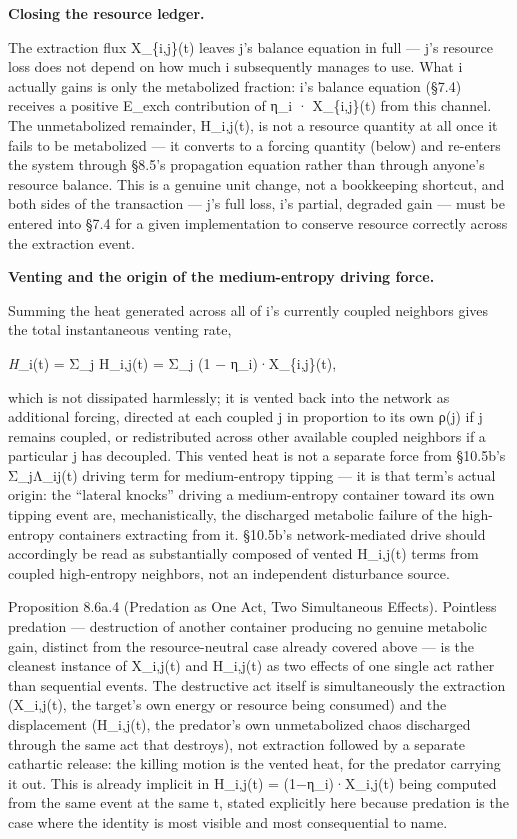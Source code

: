 \documentclass[
]{article}
\begin{document}
\textbf{Closing the resource ledger.}

The extraction flux X\_\{i,j\}(t) leaves j's balance equation in full
--- j's resource loss does not depend on how much i subsequently manages
to use. What i actually gains is only the metabolized fraction: i's
balance equation (§7.4) receives a positive E\_exch contribution of η\_i
· X\_\{i,j\}(t) from this channel. The unmetabolized remainder,
H\_i,j(t), is not a resource quantity at all once it fails to be
metabolized --- it converts to a forcing quantity (below) and re-enters
the system through §8.5's propagation equation rather than through
anyone's resource balance. This is a genuine unit change, not a
bookkeeping shortcut, and both sides of the transaction --- j's full
loss, i's partial, degraded gain --- must be entered into §7.4 for a
given implementation to conserve resource correctly across the
extraction event.

\textbf{Venting and the origin of the medium-entropy driving force.}

Summing the heat generated across all of i's currently coupled neighbors
gives the total instantaneous venting rate,

\emph{H}\_i(t) = Σ\_j H\_i,j(t) = Σ\_j (1 − η\_i)·X\_\{i,j\}(t),

which is not dissipated harmlessly; it is vented back into the network
as additional forcing, directed at each coupled j in proportion to its
own ρ(j) if j remains coupled, or redistributed across other available
coupled neighbors if a particular j has decoupled. This vented heat is
not a separate force from §10.5b's Σ\_jΛ\_ij(t) driving term for
medium-entropy tipping --- it is that term's actual origin: the
``lateral knocks'' driving a medium-entropy container toward its own
tipping event are, mechanistically, the discharged metabolic failure of
the high-entropy containers extracting from it. §10.5b's
network-mediated drive should accordingly be read as substantially
composed of vented H\_i,j(t) terms from coupled high-entropy neighbors,
not an independent disturbance source.

Proposition 8.6a.4 (Predation as One Act, Two Simultaneous Effects).
Pointless predation --- destruction of another container producing no
genuine metabolic gain, distinct from the resource-neutral case already
covered above --- is the cleanest instance of X\_i,j(t) and H\_i,j(t) as
two effects of one single act rather than sequential events. The
destructive act itself is simultaneously the extraction (X\_i,j(t), the
target's own energy or resource being consumed) and the displacement
(H\_i,j(t), the predator's own unmetabolized chaos discharged through
the same act that destroys), not extraction followed by a separate
cathartic release: the killing motion is the vented heat, for the
predator carrying it out. This is already implicit in H\_i,j(t) =
(1−η\_i)·X\_i,j(t) being computed from the same event at the same t,
stated explicitly here because predation is the case where the identity
is most visible and most consequential to name.
\end{document}

